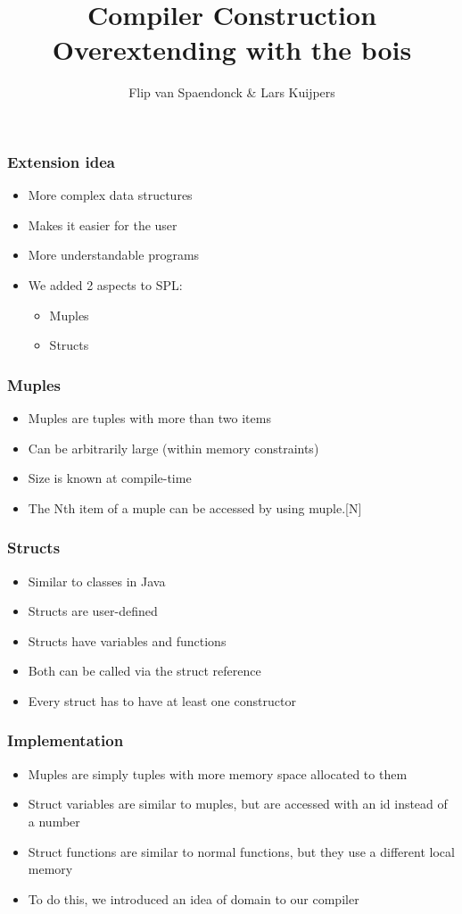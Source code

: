 \documentclass{beamer}
\author[Flip \& Lars]{Flip van Spaendonck \& Lars Kuijpers}
\title{Compiler Construction \\ Overextending with the bois }
\begin{document}
\begin{frame}
\titlepage
\end{frame}

\begin{frame}
\frametitle{Extension idea}
\begin{itemize}
\item More complex data structures
\item Makes it easier for the user
\item More understandable programs
\item We added 2 aspects to SPL:
\begin{itemize}
\item Muples
\item Structs
\end{itemize}
\end{itemize}
\end{frame}

\begin{frame}
\frametitle{Muples}
\begin{itemize}
\item Muples are tuples with more than two items
\item Can be arbitrarily large (within memory constraints)
\item Size is known at compile-time
\item The Nth item of a muple can be accessed by using muple.[N]
\end{itemize}
\end{frame}

\begin{frame}
\frametitle{Structs}
\begin{itemize}
\item Similar to classes in Java
\item Structs are user-defined
\item Structs have variables and functions
\item Both can be called via the struct reference
\item Every struct has to have at least one constructor
\end{itemize}
\end{frame}

\begin{frame}
\frametitle{Implementation}
\begin{itemize}
\item Muples are simply tuples with more memory space allocated to them
\item Struct variables are similar to muples, but are accessed with an id instead of a number
\item Struct functions are similar to normal functions, but they use a different local memory
\item To do this, we introduced an idea of domain to our compiler
\end{itemize}
\end{frame}
\end{document}
